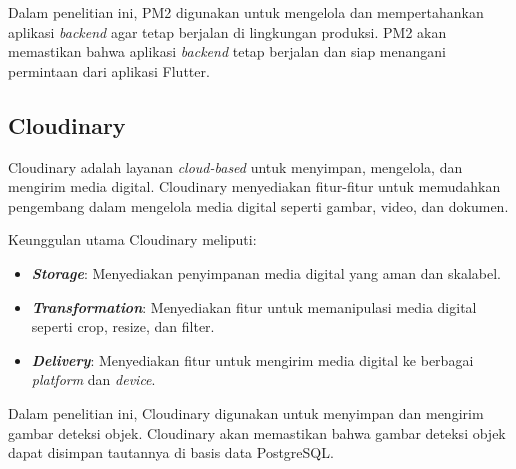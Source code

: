 Dalam penelitian ini, PM2 digunakan untuk mengelola dan mempertahankan aplikasi \emph{backend} agar tetap berjalan di lingkungan produksi. PM2 akan memastikan bahwa aplikasi \emph{backend} tetap berjalan dan siap menangani permintaan dari aplikasi Flutter.

\subsection{Cloudinary}

Cloudinary adalah layanan \emph{cloud-based} untuk menyimpan, mengelola, dan mengirim media digital. Cloudinary menyediakan fitur-fitur untuk memudahkan pengembang dalam mengelola media digital seperti gambar, video, dan dokumen. \parencite*{cloudinary2024}

Keunggulan utama Cloudinary meliputi:
\begin{itemize}[nolistsep]
  \item \textbf{\emph{Storage}}: Menyediakan penyimpanan media digital yang aman dan skalabel.
  \item \textbf{\emph{Transformation}}: Menyediakan fitur untuk memanipulasi media digital seperti crop, resize, dan filter.
  \item \textbf{\emph{Delivery}}: Menyediakan fitur untuk mengirim media digital ke berbagai \emph{platform} dan \emph{device}.
\end{itemize}

Dalam penelitian ini, Cloudinary digunakan untuk menyimpan dan mengirim gambar deteksi objek. Cloudinary akan memastikan bahwa gambar deteksi objek dapat disimpan tautannya di basis data PostgreSQL.